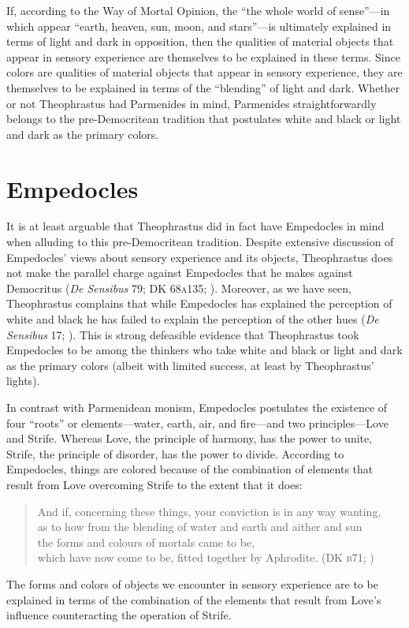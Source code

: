 If, according to the Way of Mortal Opinion, the ``the whole world of sense''---in which appear ``earth, heaven, sun, moon, and stars''---is ultimately explained in terms of light and dark in opposition, then the qualities of material objects that appear in sensory experience are themselves to be explained in these terms. Since colors are qualities of material objects that appear in sensory experience, they are themselves to be explained in terms of the ``blending'' of light and dark. Whether or not Theophrastus had Parmenides in mind, Parmenides straightforwardly belongs to the pre-Democritean tradition that postulates white and black or light and dark as the primary colors.


\section{Empedocles} %
\label{sec:empedocles}

It is at least arguable that Theophrastus did in fact have Empedocles in mind when alluding to this pre-Democritean tradition. Despite extensive discussion of Empedocles' views about sensory experience and its objects, Theophrastus does not make the parallel charge against Empedocles that he makes against Democritus (\emph{De Sensibus} 79; DK 68\textsc{a}135; \citealt{Stratton:1917vn}). Moreover, as we have seen, Theophrastus complains that while Empedocles has explained the perception of white and black he has failed to explain the perception of the other hues (\emph{De Sensibus} 17; \citealt{Stratton:1917vn}). This is strong defeasible evidence that Theophrastus took Empedocles to be among the thinkers who take white and black or light and dark as the primary colors (albeit with limited success, at least by Theophrastus' lights).

In contrast with Parmenidean monism, Empedocles postulates the existence of four ``roots'' or elements---water, earth, air, and fire---and two principles---\-Love and Strife. Whereas Love, the principle of harmony, has the power to unite, Strife, the principle of disorder, has the power to divide. According to Empedocles, things are colored because of the combination of elements that result from Love overcoming Strife to the extent that it does:
\begin{verse}
    And if, concerning these things, your conviction is in any way wanting,\\
    as to how from the blending of water and earth and aither and sun\\
    the forms and colours of mortals came to be,\\
    which have now come to be, fitted together by Aphrodite.
    (DK \textsc{b}71; \citealt[74 249]{Inwood:2001ve})
\end{verse}
The forms and colors of objects we encounter in sensory experience are to be explained in terms of the combination of the elements that result from Love's influence counteracting the operation of Strife.

